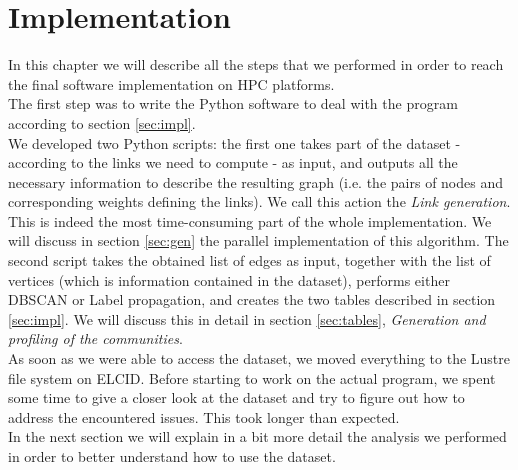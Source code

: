 \documentclass[a4paper,11pt]{book}
\begin{document}
\chapter{Implementation}
In this chapter we will describe all the steps that we performed in order to reach the final software implementation on HPC platforms.\\

The first step was to write the Python software to deal with the program according to section \ref{sec:impl}.\\
We developed two Python scripts: the first one takes part of the dataset - according to the links we need to compute - as input, and outputs all the necessary information to describe the resulting graph (i.e. the pairs of nodes and corresponding weights defining the links). We call this action the \textit{Link generation}. This is indeed the most time-consuming part of the whole implementation. We will discuss in section \ref{sec:gen} the parallel implementation of this algorithm. The second script takes the obtained list of edges as input, together with the list of vertices (which is information contained in the dataset), performs either DBSCAN or Label propagation, and creates the two tables described in section  \ref{sec:impl}. We will discuss this in detail in section \ref{sec:tables}, \textit{Generation and profiling of the communities}.\\
As soon as we were able to access the dataset, we moved everything to the Lustre file system on ELCID. Before starting to work on the actual program, we spent some time to give a closer look at the dataset and try to figure out how to address the encountered issues. This took longer than expected.\\

In the next section we will explain in a bit more detail the analysis we performed in order to better understand how to use the dataset.
\end{document}
